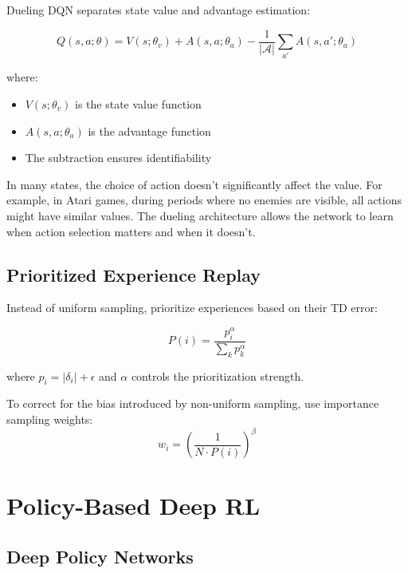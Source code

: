 Dueling DQN separates state value and advantage estimation:

\begin{equation}
Q(s, a; \theta) = V(s; \theta_v) + A(s, a; \theta_a) - \frac{1}{|\mathcal{A}|} \sum_{a'} A(s, a'; \theta_a)
\end{equation}

where:
\begin{itemize}
\item $V(s; \theta_v)$ is the state value function
\item $A(s, a; \theta_a)$ is the advantage function
\item The subtraction ensures identifiability
\end{itemize}

\begin{intuitionbox}
In many states, the choice of action doesn't significantly affect the value. For example, in Atari games, during periods where no enemies are visible, all actions might have similar values. The dueling architecture allows the network to learn when action selection matters and when it doesn't.
\end{intuitionbox}

\subsection{Prioritized Experience Replay}

Instead of uniform sampling, prioritize experiences based on their TD error:

\begin{equation}
P(i) = \frac{p_i^\alpha}{\sum_k p_k^\alpha}
\end{equation}

where $p_i = |\delta_i| + \epsilon$ and $\alpha$ controls the prioritization strength.

To correct for the bias introduced by non-uniform sampling, use importance sampling weights:
\begin{equation}
w_i = \left( \frac{1}{N \cdot P(i)} \right)^\beta
\end{equation}

\section{Policy-Based Deep RL}

\subsection{Deep Policy Networks}

